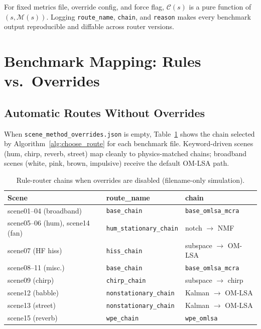 \begin{proposition}
\label{prop:routing_deterministic}
For fixed metrics file, override config, and force flag, $\mathcal{C}(s)$ is a pure function of $(s,\mathcal{M}(s))$. Logging \texttt{route\_name}, \texttt{chain}, and \texttt{reason} makes every benchmark output reproducible and diffable across router versions.
\end{proposition}

\section{Benchmark Mapping: Rules vs.\ Overrides}
\label{sec:benchmark_mapping}

\subsection{Automatic Routes Without Overrides}

When \texttt{scene\_method\_overrides.json} is empty, Table~\ref{tab:scene_rule_routes} shows the chain selected by Algorithm~\ref{alg:choose_route} for each benchmark file. Keyword-driven scenes (hum, chirp, reverb, street) map cleanly to physics-matched chains; broadband scenes (white, pink, brown, impulsive) receive the default OM-LSA path.

\begin{table}[H]
  \centering
  \caption{Rule-router chains when overrides are disabled (filename-only simulation).}
  \label{tab:scene_rule_routes}
  \small
  \begin{tabular}{lll}
    \toprule
    \textbf{Scene} & \textbf{route\_name} & \textbf{chain} \\
    \midrule
    scene01--04 (broadband)     & \texttt{base\_chain} & \texttt{base\_omlsa\_mcra} \\
    scene05--06 (hum), scene14 (fan) & \texttt{hum\_stationary\_chain} & notch $\rightarrow$ NMF \\
    scene07 (HF hiss)           & \texttt{hiss\_chain} & subspace $\rightarrow$ OM-LSA \\
    scene08--11 (misc.)         & \texttt{base\_chain} & \texttt{base\_omlsa\_mcra} \\
    scene09 (chirp)             & \texttt{chirp\_chain} & subspace $\rightarrow$ chirp \\
    scene12 (babble)            & \texttt{nonstationary\_chain} & Kalman $\rightarrow$ OM-LSA \\
    scene13 (street)            & \texttt{nonstationary\_chain} & Kalman $\rightarrow$ OM-LSA \\
    scene15 (reverb)            & \texttt{wpe\_chain} & \texttt{wpe\_omlsa} \\
    \bottomrule
  \end{tabular}
\end{table}

